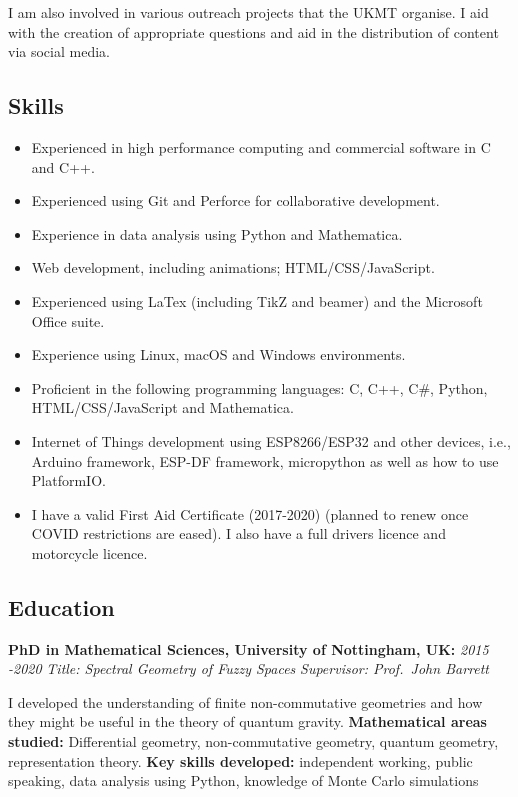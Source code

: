 \documentclass[a4paper,12pt]{article}
\begin{document}
I am also involved in various outreach projects that the UKMT organise.
I aid with the creation of appropriate questions and aid in the
distribution of content via social media.

\hypertarget{skills}{%
\subsection{Skills}\label{skills}}

\begin{itemize}
\tightlist
\item
  Experienced in high performance computing and commercial software in C
  and C++.
\item
  Experienced using Git and Perforce for collaborative development.
\item
  Experience in data analysis using Python and Mathematica.
\item
  Web development, including animations; HTML/CSS/JavaScript.
\item
  Experienced using LaTex (including TikZ and beamer) and the Microsoft
  Office suite.
\item
  Experience using Linux, macOS and Windows environments.
\item
  Proficient in the following programming languages: C, C++, C\#,
  Python, HTML/CSS/JavaScript and Mathematica.
\item
  Internet of Things development using ESP8266/ESP32 and other devices,
  i.e., Arduino framework, ESP-DF framework, micropython as well as how
  to use PlatformIO.
\item
  I have a valid First Aid Certificate (2017-2020) (planned to renew
  once COVID restrictions are eased). I also have a full drivers licence
  and motorcycle licence.
\end{itemize}

\hypertarget{education}{%
\subsection{Education}\label{education}}

\textbf{PhD in Mathematical Sciences, University of Nottingham, UK:}
{\emph{2015 -2020}} \emph{Title: Spectral Geometry of Fuzzy Spaces}
\emph{Supervisor: Prof.~John Barrett}

I developed the understanding of finite non-commutative geometries and
how they might be useful in the theory of quantum gravity.
\textbf{Mathematical areas studied:} Differential geometry,
non-commutative geometry, quantum geometry, representation theory.
\textbf{Key skills developed:} independent working, public speaking,
data analysis using Python, knowledge of Monte Carlo simulations
\end{document}
